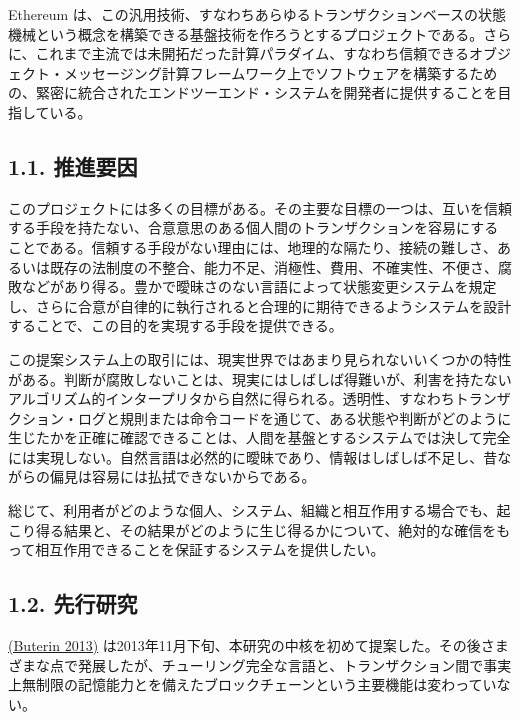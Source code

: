 \documentclass[
]{ltjsarticle}
\begin{document}
Ethereum
は、この汎用技術、すなわちあらゆるトランザクションベースの状態機械という概念を構築できる基盤技術を作ろうとするプロジェクトである。さらに、これまで主流では未開拓だった計算パラダイム、すなわち信頼できるオブジェクト・メッセージング計算フレームワーク上でソフトウェアを構築するための、緊密に統合されたエンドツーエンド・システムを開発者に提供することを目指している。

\protect\hypertarget{ch:driving}{}{}

\hypertarget{ux63a8ux9032ux8981ux56e0}{%
\subsection{1.1. 推進要因}\label{ux63a8ux9032ux8981ux56e0}}

このプロジェクトには多くの目標がある。その主要な目標の一つは、互いを信頼する手段を持たない、合意意思のある個人間のトランザクションを容易にすることである。信頼する手段がない理由には、地理的な隔たり、接続の難しさ、あるいは既存の法制度の不整合、能力不足、消極性、費用、不確実性、不便さ、腐敗などがあり得る。豊かで曖昧さのない言語によって状態変更システムを規定し、さらに合意が自律的に執行されると合理的に期待できるようシステムを設計することで、この目的を実現する手段を提供できる。

この提案システム上の取引には、現実世界ではあまり見られないいくつかの特性がある。判断が腐敗しないことは、現実にはしばしば得難いが、利害を持たないアルゴリズム的インタープリタから自然に得られる。透明性、すなわちトランザクション・ログと規則または命令コードを通じて、ある状態や判断がどのように生じたかを正確に確認できることは、人間を基盤とするシステムでは決して完全には実現しない。自然言語は必然的に曖昧であり、情報はしばしば不足し、昔ながらの偏見は容易には払拭できないからである。

総じて、利用者がどのような個人、システム、組織と相互作用する場合でも、起こり得る結果と、その結果がどのように生じ得るかについて、絶対的な確信をもって相互作用できることを保証するシステムを提供したい。

\protect\hypertarget{ch:previous}{}{}

\hypertarget{ux5148ux884cux7814ux7a76}{%
\subsection{1.2. 先行研究}\label{ux5148ux884cux7814ux7a76}}

\protect\hyperlink{ref-buterin2013ethereum}{(Buterin 2013)}
は2013年11月下旬、本研究の中核を初めて提案した。その後さまざまな点で発展したが、チューリング完全な言語と、トランザクション間で事実上無制限の記憶能力とを備えたブロックチェーンという主要機能は変わっていない。
\end{document}
